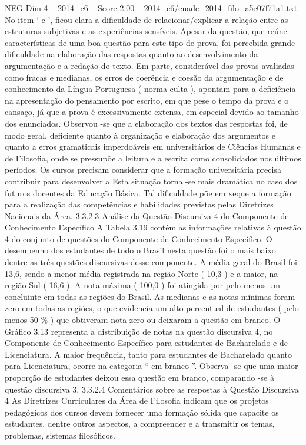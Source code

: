 \begin{textsample}{NEG Dim 4 – 2014\_c6 – Score 2.00 – 2014\_c6/enade\_2014\_filo\_a5e07f71a1.txt}
No item ‘ c ’, ficou clara a dificuldade de relacionar/explicar a relação entre as estruturas subjetivas e as experiências sensíveis.
Apesar da questão, que reúne características de uma boa questão para este tipo de prova, foi percebida grande dificuldade na elaboração das respostas quanto ao desenvolvimento da argumentação e a redação do texto.
Em parte, considerável das provas avaliadas como fracas e medianas, os erros de coerência e coesão da argumentação e de conhecimento da Língua Portuguesa ( norma culta ), apontam para a deficiência na apresentação do pensamento por escrito, em que pese o tempo da prova e o cansaço, já que a prova é excessivamente extensa, em especial devido ao tamanho dos enunciados.
Observou -se que a elaboração dos textos das respostas foi, de modo geral, deficiente quanto à organização e elaboração dos argumentos e quanto a erros gramaticais imperdoáveis em universitários de Ciências Humanas e de Filosofia, onde se pressupõe a leitura e a escrita como consolidados nos últimos períodos.
Os cursos precisam considerar que a formação universitária precisa contribuir para desenvolver a Esta situação torna -se mais dramática no caso dos futuros docentes da Educação Básica.
Tal dificuldade põe em xeque a formação para a realização das competências e habilidades previstas pelas Diretrizes Nacionais da Área. 3.3.2.3 Análise da Questão Discursiva 4 do Componente de Conhecimento Específico A Tabela 3.19 contém as informações relativas à questão 4 do conjunto de questões do Componente de Conhecimento Específico.
O desempenho dos estudantes de todo o Brasil nesta questão foi o mais baixo dentre as três questões discursivas desse componente.
A média geral do Brasil foi 13,6, sendo a menor média registrada na região Norte ( 10,3 ) e a maior, na região Sul ( 16,6 ).
A nota máxima ( 100,0 ) foi atingida por pelo menos um concluinte em todas as regiões do Brasil.
As medianas e as notas mínimas foram zero em todas as regiões, o que evidencia um alto percentual de estudantes ( pelo menos 50 \% ) que obtiveram nota zero ou deixaram a questão em branco.
O Gráfico 3.13 representa a distribuição de notas na questão discursiva 4, no Componente de Conhecimento Específico para estudantes de Bacharelado e de Licenciatura.
A maior frequência, tanto para estudantes de Bacharelado quanto para Licenciatura, ocorre na categoria “ em branco ”.
Observa -se que uma maior proporção de estudantes deixou essa questão em branco, comparando -se à questão discursiva 3. 3.3.2.4 Comentários sobre as respostas à Questão Discursiva 4 As Diretrizes Curriculares da Área de Filosofia indicam que os projetos pedagógicos dos cursos devem fornecer uma formação sólida que capacite os estudantes, dentre outros aspectos, a compreender e a transmitir os temas, problemas, sistemas filosóficos.

\end{textsample}
